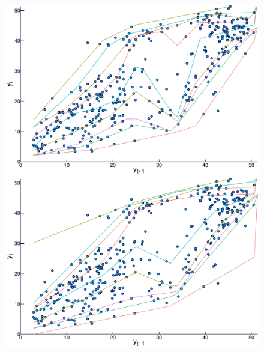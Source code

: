 \begin{figure}[htp]
\begin{minipage}[t]{0.4\linewidth}
\begin{minipage}[b]{\linewidth}
      \centering     \includegraphics[width=\textwidth]{Figuras/regressao-quantilica/icaraizinho-crossing-1}
     \end{minipage}
  \end{minipage}
  \begin{minipage}[t]{0.4\linewidth}
    \centering
    \begin{minipage}[t]{\linewidth}
      \centering     \includegraphics[width=\textwidth]{Figuras/regressao-quantilica/icaraizinho-crossing-3}
    \end{minipage}
    \begin{minipage}[b]{\linewidth}

\end{minipage}
\end{minipage}
\end{figure}
